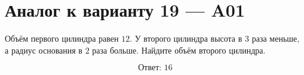 \documentclass[12pt,a4paper]{article}
\begin{document}
\section*{Аналог к варианту 19 — A01}

Объём первого цилиндра равен \(12\). У второго цилиндра высота в \(3\) раза меньше, а радиус основания в \(2\) раза больше. Найдите объём второго цилиндра.

\begin{center}
\end{center}

\[
\boxed{\text{Ответ: }16}
\]
\end{document}
